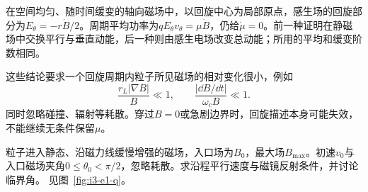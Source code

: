 在空间均匀、随时间缓变的轴向磁场中，以回旋中心为局部原点，感生场的回旋部分为$E_\theta=-r\dot B/2$。周期平均功率为$qE_\theta v_\theta=\mu\dot B$，仍给$\dot\mu=0$。前一种证明在静磁场中交换平行与垂直动能，后一种则由感生电场改变总动能；所用的平均和缓变阶数相同。

这些结论要求一个回旋周期内粒子所见磁场的相对变化很小，例如
\[
\frac{r_L|\nabla B|}{B}\ll1,\qquad
\frac{|\dd B/\dd t|}{\omega_cB}\ll1.
\]
同时忽略碰撞、辐射等耗散。穿过$B=0$或急剧边界时，回旋描述本身可能失效，不能继续无条件保留$\mu$。


\begin{example}[磁镜的反射条件]\label{ex:i3-e1}
粒子进入静态、沿磁力线缓慢增强的磁场，入口场为$B_0$，最大场$B_{\max}$。初速$v_0$与入口磁场夹角$0\le\theta_0<\pi/2$，忽略耗散。求沿程平行速度与磁镜反射条件，并讨论临界角。 见图~\ref{fig:i3-e1-q}。
\end{example}

